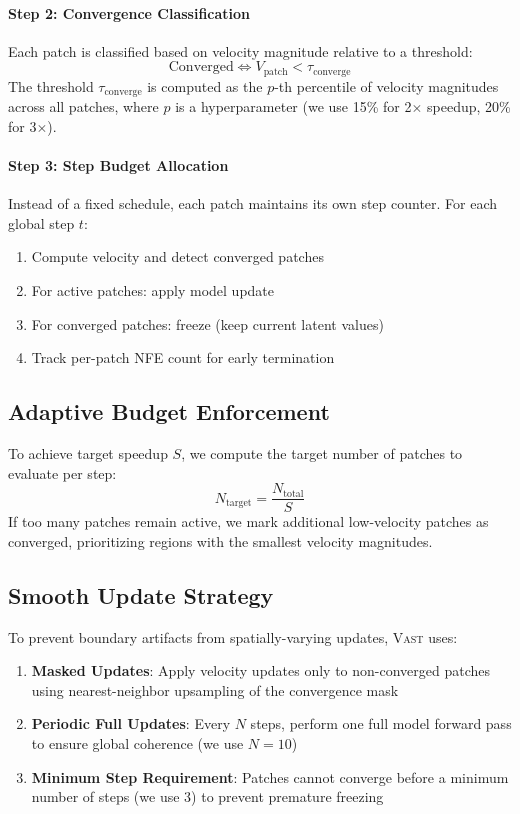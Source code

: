 \documentclass{article}
\newcommand{\vast}{\textsc{Vast}}
\begin{document}
\paragraph{Step 2: Convergence Classification}
Each patch is classified based on velocity magnitude relative to a threshold:
\begin{equation}
    \text{Converged} \iff V_{\text{patch}} < \tau_{\text{converge}}
\end{equation}
The threshold $\tau_{\text{converge}}$ is computed as the $p$-th percentile of velocity magnitudes across all patches, where $p$ is a hyperparameter (we use 15\% for 2$\times$ speedup, 20\% for 3$\times$).

\paragraph{Step 3: Step Budget Allocation}
Instead of a fixed schedule, each patch maintains its own step counter. For each global step $t$:
\begin{enumerate}
    \item Compute velocity and detect converged patches
    \item For active patches: apply model update
    \item For converged patches: freeze (keep current latent values)
    \item Track per-patch NFE count for early termination
\end{enumerate}

\subsection{Adaptive Budget Enforcement}

To achieve target speedup $S$, we compute the target number of patches to evaluate per step:
\begin{equation}
    N_{\text{target}} = \frac{N_{\text{total}}}{S}
\end{equation}
If too many patches remain active, we mark additional low-velocity patches as converged, prioritizing regions with the smallest velocity magnitudes.

\subsection{Smooth Update Strategy}

To prevent boundary artifacts from spatially-varying updates, \vast{} uses:
\begin{enumerate}
    \item \textbf{Masked Updates}: Apply velocity updates only to non-converged patches using nearest-neighbor upsampling of the convergence mask
    \item \textbf{Periodic Full Updates}: Every $N$ steps, perform one full model forward pass to ensure global coherence (we use $N=10$)
    \item \textbf{Minimum Step Requirement}: Patches cannot converge before a minimum number of steps (we use 3) to prevent premature freezing
\end{enumerate}
\end{document}
